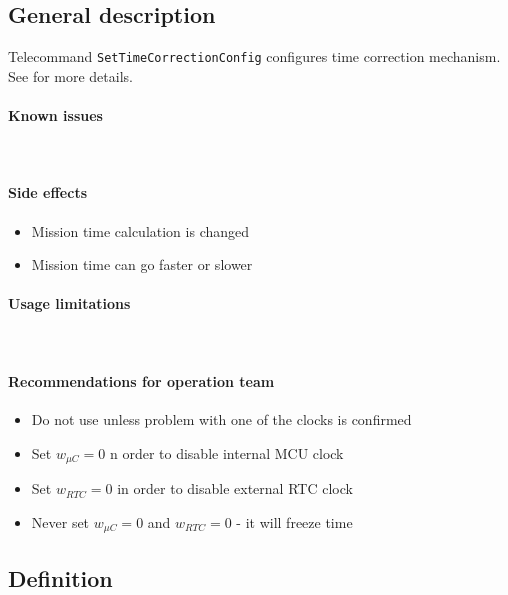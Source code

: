 \newcommand{\deltaMcu}{\Delta t_{\mu C}}
\newcommand{\deltaRtc}{\Delta t_{RTC}}
\newcommand{\wMcu}{w_{\mu C}}
\newcommand{\wRtc}{w_{RTC}}
\newcommand{\correctionValue}{\Delta t}



\subsection{General description}
Telecommand \texttt{SetTimeCorrectionConfig} configures time correction mechanism. See  for more details.

\paragraph{Known issues} \mbox{} \\
\None

\paragraph{Side effects} 
\begin{itemize}
	\item Mission time calculation is changed
	\item Mission time can go faster or slower
\end{itemize}


\paragraph{Usage limitations} \mbox{} \\
\None

\paragraph{Recommendations for operation team}
\begin{itemize}
	\item Do not use unless problem with one of the clocks is confirmed
	\item Set $\wMcu = 0$ n order to disable internal MCU clock
	\item Set $\wRtc = 0$ in order to disable external RTC clock	
	\item Never set $\wMcu = 0$ and $\wRtc = 0$  - it will freeze time
\end{itemize}

\subsection{Definition}

